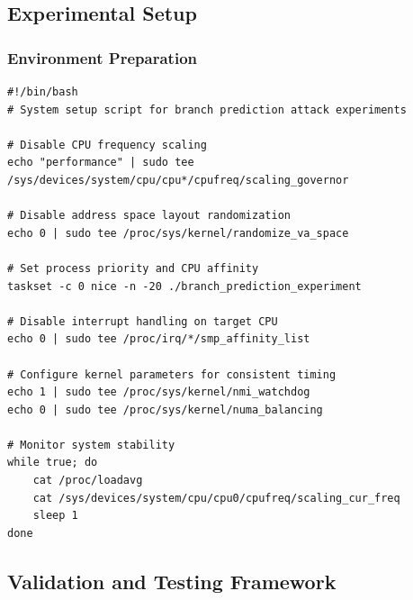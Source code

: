 \documentclass[11pt,a4paper]{article}
\theoremstyle{definition}
\begin{document}
\subsection{Experimental Setup}

\subsubsection{Environment Preparation}

\begin{lstlisting}[caption={System Configuration for Branch Prediction Experiments}]
#!/bin/bash
# System setup script for branch prediction attack experiments

# Disable CPU frequency scaling
echo "performance" | sudo tee /sys/devices/system/cpu/cpu*/cpufreq/scaling_governor

# Disable address space layout randomization
echo 0 | sudo tee /proc/sys/kernel/randomize_va_space

# Set process priority and CPU affinity
taskset -c 0 nice -n -20 ./branch_prediction_experiment

# Disable interrupt handling on target CPU
echo 0 | sudo tee /proc/irq/*/smp_affinity_list

# Configure kernel parameters for consistent timing
echo 1 | sudo tee /proc/sys/kernel/nmi_watchdog
echo 0 | sudo tee /proc/sys/kernel/numa_balancing

# Monitor system stability
while true; do
    cat /proc/loadavg
    cat /sys/devices/system/cpu/cpu0/cpufreq/scaling_cur_freq
    sleep 1
done
\end{lstlisting}

\subsection{Validation and Testing Framework}
\end{document}
